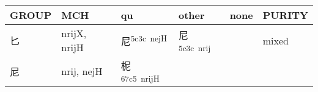\documentclass[14pt,a4paper]{scrartcl}
\begin{document}
\begin{longtable}[c]{@{}llllll@{}}
\toprule
\begin{minipage}[b]{0.14\columnwidth}\raggedright\strut
GROUP
\strut\end{minipage} &
\begin{minipage}[b]{0.14\columnwidth}\raggedright\strut
MCH
\strut\end{minipage} &
\begin{minipage}[b]{0.14\columnwidth}\raggedright\strut
qu
\strut\end{minipage} &
\begin{minipage}[b]{0.14\columnwidth}\raggedright\strut
other
\strut\end{minipage} &
\begin{minipage}[b]{0.14\columnwidth}\raggedright\strut
none
\strut\end{minipage} &
\begin{minipage}[b]{0.14\columnwidth}\raggedright\strut
PURITY
\strut\end{minipage}\tabularnewline
\midrule
\endhead
\begin{minipage}[t]{0.14\columnwidth}\raggedright\strut
匕
\strut\end{minipage} &
\begin{minipage}[t]{0.14\columnwidth}\raggedright\strut
nrijX, nrijH
\strut\end{minipage} &
\begin{minipage}[t]{0.14\columnwidth}\raggedright\strut
尼\textsuperscript{5c3c~nejH}
\strut\end{minipage} &
\begin{minipage}[t]{0.14\columnwidth}\raggedright\strut
尼\textsuperscript{5c3c~nrij}
\strut\end{minipage} &
\begin{minipage}[t]{0.14\columnwidth}\raggedright\strut
\strut\end{minipage} &
\begin{minipage}[t]{0.14\columnwidth}\raggedright\strut
mixed
\strut\end{minipage}\tabularnewline
\begin{minipage}[t]{0.14\columnwidth}\raggedright\strut
尼
\strut\end{minipage} &
\begin{minipage}[t]{0.14\columnwidth}\raggedright\strut
nrij, nejH
\strut\end{minipage} &
\begin{minipage}[t]{0.14\columnwidth}\raggedright\strut
柅\textsuperscript{67c5~nrijH}

\end{minipage}
\end{longtable}
\end{document}
